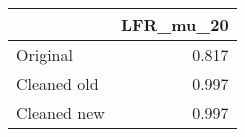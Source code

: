 \begin{tabular}{lr}
\toprule
{} & LFR_mu_20 \\
\midrule
Original    &     0.817 \\
Cleaned old &     0.997 \\
Cleaned new &     0.997 \\
\bottomrule
\end{tabular}
